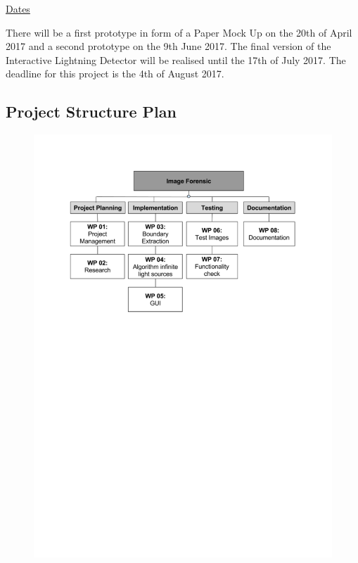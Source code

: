 \underline{Dates} 

There will be a first prototype in form of a Paper Mock Up on the 20th of April 2017
and a second prototype on the 9th June 2017. The final version of the Interactive Lightning Detector will be realised until the 17th of July 2017. The deadline for this project is the 4th of August 2017.


\subsection{Project Structure Plan} \label{sec:StructurePlan}
\begin{figure}[H] 
	\center 
	\includegraphics[scale = 0.8]{Images/Project Structure Plan.pdf}		
\end{figure}

